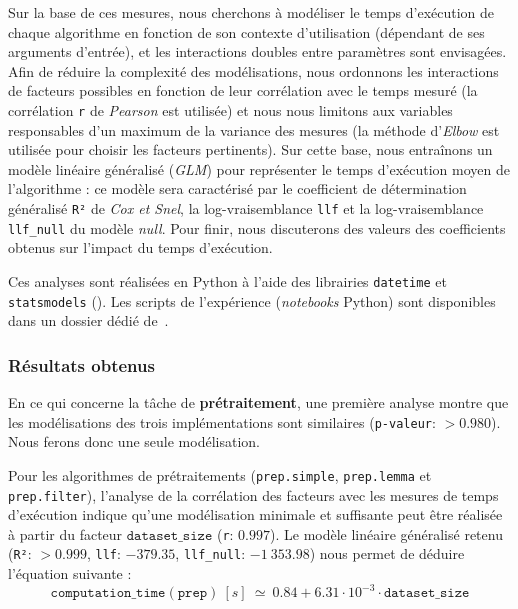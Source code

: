 			Sur la base de ces mesures, nous cherchons à modéliser le temps d'exécution de chaque algorithme en fonction de son contexte d'utilisation (dépendant de ses arguments d'entrée), et les interactions doubles entre paramètres sont envisagées.
			Afin de réduire la complexité des modélisations, nous ordonnons les interactions de facteurs possibles en fonction de leur corrélation avec le temps mesuré (la corrélation \texttt{r} de \textit{Pearson} est utilisée) et nous nous limitons aux variables responsables d'un maximum de la variance des mesures (la méthode d'\textit{Elbow} est utilisée pour choisir les facteurs pertinents).
			Sur cette base, nous entraînons un modèle linéaire généralisé (\textit{GLM}) pour représenter le temps d'exécution moyen de l'algorithme : ce modèle sera caractérisé par le coefficient de détermination généralisé \texttt{R²} de \textit{Cox et Snel}, la log-vraisemblance \texttt{llf} et la log-vraisemblance \texttt{llf\_null} du modèle \textit{null}.
			Pour finir, nous discuterons des valeurs des coefficients obtenus sur l'impact du temps d'exécution.
			
			\begin{leftBarInformation}
				Ces analyses sont réalisées en Python à l'aide des librairies \texttt{datetime} et \texttt{statsmodels} (\cite{seabold:2010}).
				Les scripts de l'expérience (\textit{notebooks} Python) sont disponibles dans un dossier dédié de~\cite{schild:cognitivefactory-interactive-clustering-comparative-study:2021}.
			\end{leftBarInformation}

		\subsubsection{Résultats obtenus}
				
			
			En ce qui concerne la tâche de \textbf{prétraitement}, une première analyse montre que les modélisations des trois implémentations sont similaires (\texttt{p-valeur}: $> 0.980$). Nous ferons donc une seule modélisation.
			
			Pour les algorithmes de prétraitements (\texttt{prep.simple}, \texttt{prep.lemma} et \texttt{prep.filter}), l'analyse de la corrélation des facteurs avec les mesures de temps d'exécution indique qu'une modélisation minimale et suffisante peut être réalisée à partir du facteur $\texttt{dataset\_size}$ (\texttt{r}: $0.997$).
			Le modèle linéaire généralisé retenu (\texttt{R²}: $> 0.999$, \texttt{llf}: $-379.35$, \texttt{llf\_null}: $-1~353.98$) nous permet de déduire l'équation suivante :
			\begin{equation}
				\texttt{computation\_time}(\texttt{prep})~[s]~
				\simeq~0.84 + 6.31 \cdot 10^{-3} \cdot \texttt{dataset\_size}
			\end{equation}
			
